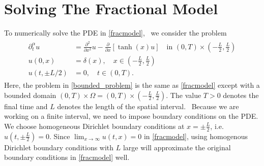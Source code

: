 \documentclass{siamart1116}
\newcommand{\LB}[1]{{\color{blue}~\textsf{#1}}}
\begin{document}





\section{Solving The Fractional Model} \label{s:Solving The Fractional Model} 
To numerically solve the PDE in \eqref{fracmodel}, \LB{we consider the problem
\begin{align}\label{bounded_problem}
\begin{aligned}
\partial^{\alpha}_{t}u 
 &=\frac{\partial^2}{\partial x^2}u-\frac{\partial}{\partial x}\left[\tanh(x)u\right] 
     \quad \text{in }  (0,T)\times\left(-\frac{L}{2},\frac{L}{2}\right) \\
u(0,x) &=\delta(x), \quad x \in \left(-\frac{L}{2},\frac{L}{2}\right) \\
u(t,\pm L/2) &= 0, \quad t\in(0,T).
\end{aligned}
\end{align}
 Here, the problem in \eqref{bounded_problem} is the same as \eqref{fracmodel} except with a bounded domain $(0,T)\times\Omega=(0,T)\times(-\frac{L}{2},\frac{L}{2})$. The value}
  $T>0$ denotes the final time and $L$ denotes the length of the spatial interval. 
\LB{Because we are working on a finite interval, we need to impose boundary conditions on the PDE. We choose homogeneous Dirichlet boundary conditions at $x=\pm\frac{L}{2}$, i.e. $u\left(t,\pm \frac{L}{2}\right) = 0$. Since $\lim_{x\to\infty}u(t,x) = 0$ in \eqref{fracmodel}, using homogenous Dirichlet boundary conditions with $L$ large will approximate the original boundary conditions in \eqref{fracmodel} well.}
\end{document}

